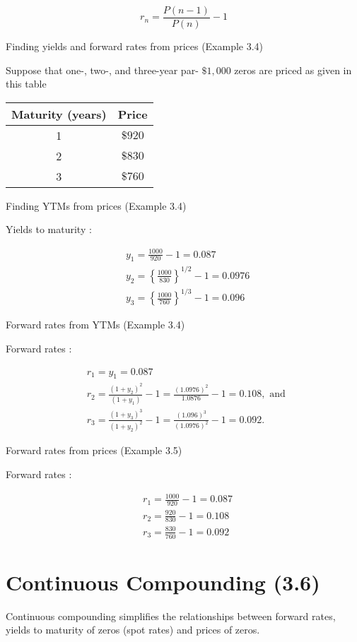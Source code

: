\documentclass[letterpaper]{article}
\begin{document}
$$
r_{n}=\frac{P(n-1)}{P(n)}-1
$$

Finding yields and forward rates from prices (Example 3.4)

Suppose that one-, two-, and three-year par- $\$ 1,000$ zeros are priced as given in this table

\begin{center}
\begin{tabular}{cc}
Maturity (years) & Price \\
\hline
1 & $\$ 920$ \\
2 & $\$ 830$ \\
3 & $\$ 760$ \\
\end{tabular}
\end{center}

Finding YTMs from prices (Example 3.4)

Yields to maturity :

$$
\begin{aligned}
& y_{1}=\frac{1000}{920}-1=0.087 \\
& y_{2}=\left\{\frac{1000}{830}\right\}^{1 / 2}-1=0.0976 \\
& y_{3}=\left\{\frac{1000}{760}\right\}^{1 / 3}-1=0.096
\end{aligned}
$$

Forward rates from YTMs (Example 3.4)

Forward rates :

$$
\begin{aligned}
& r_{1}=y_{1}=0.087 \\
& r_{2}=\frac{\left(1+y_{2}\right)^{2}}{\left(1+y_{1}\right)}-1=\frac{(1.0976)^{2}}{1.0876}-1=0.108, \text { and } \\
& r_{3}=\frac{\left(1+y_{3}\right)^{3}}{\left(1+y_{2}\right)^{2}}-1=\frac{(1.096)^{3}}{(1.0976)^{2}}-1=0.092 .
\end{aligned}
$$

Forward rates from prices (Example 3.5)

Forward rates :

$$
\begin{aligned}
& r_{1}=\frac{1000}{920}-1=0.087 \\
& r_{2}=\frac{920}{830}-1=0.108 \\
& r_{3}=\frac{830}{760}-1=0.092
\end{aligned}
$$

\section*{Continuous Compounding (3.6)}
Continuous compounding simplifies the relationships between forward rates, yields to maturity of zeros (spot rates) and prices of zeros.
\end{document}
